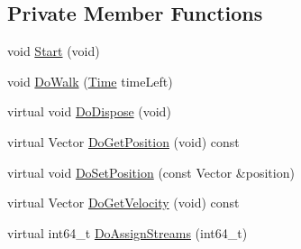 \subsection*{Private Member Functions}
\begin{DoxyCompactItemize}
\item 
void \hyperlink{classns3_1_1GaussMarkovMobilityModel_aad0bc916f9593960e6b2b72884688774}{Start} (void)
\item 
void \hyperlink{classns3_1_1GaussMarkovMobilityModel_a1ede407a75cc9524898cde98368bd395}{Do\+Walk} (\hyperlink{classns3_1_1Time}{Time} time\+Left)
\item 
virtual void \hyperlink{classns3_1_1GaussMarkovMobilityModel_aa06491c2b49c51d109488700e0346e7b}{Do\+Dispose} (void)
\item 
virtual Vector \hyperlink{classns3_1_1GaussMarkovMobilityModel_a950ce1f7e478d748aa3a92d405167327}{Do\+Get\+Position} (void) const 
\item 
virtual void \hyperlink{classns3_1_1GaussMarkovMobilityModel_abe13b92e3c92adfff7aee6cbb6b52f26}{Do\+Set\+Position} (const Vector \&position)
\item 
virtual Vector \hyperlink{classns3_1_1GaussMarkovMobilityModel_ac200e7f4bc90336a205e5d09e10e2143}{Do\+Get\+Velocity} (void) const 
\item 
virtual int64\+\_\+t \hyperlink{classns3_1_1GaussMarkovMobilityModel_a5e9d55ab98d520de29f4afdf3d19394b}{Do\+Assign\+Streams} (int64\+\_\+t)
\end{DoxyCompactItemize}
